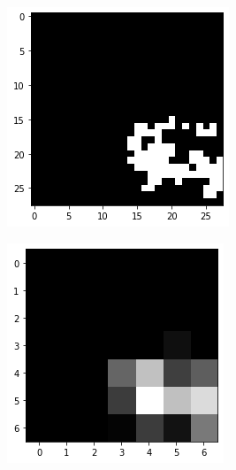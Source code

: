 \documentclass[10pt,twocolumn,hidelinks,letterpaper]{article}
\begin{document}
\begin{figure}
\begin{subfigure}{.59\linewidth}
\begin{subfigure}{.325\linewidth}
  	\end{subfigure}
  	\begin{subfigure}{.325\linewidth}
  		\includegraphics[width=\linewidth]{images/mmaps_example/downsampling28x28_bw.png}
  	\end{subfigure}
  	\begin{subfigure}{.325\linewidth}
  		\includegraphics[width=\linewidth]{images/mmaps_example/downsampling7x7_gray.png}

\end{subfigure}
\end{subfigure}
\end{figure}
\end{document}
